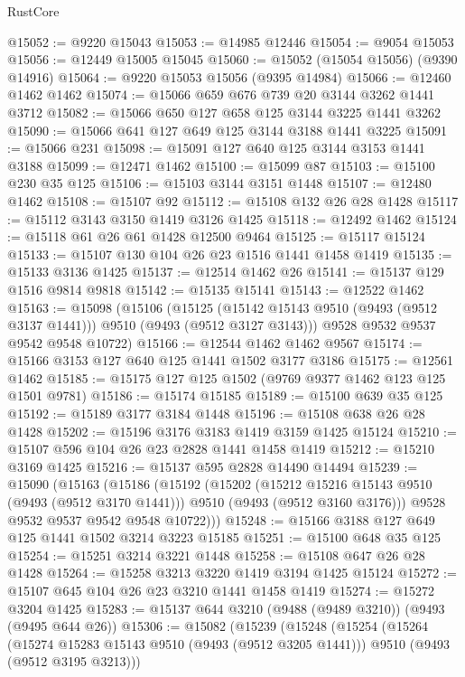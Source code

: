 \begin{lexlean}{RustCore}
\begin{coremodule}
@15052 := @9220 @15043
@15053 := @14985 @12446
@15054 := @9054 @15053
@15056 := @12449 @15005 @15045
@15060 := @15052 (@15054 @15056) (@9390 @14916)
@15064 := @9220 @15053 @15056 (@9395 @14984)
@15066 := @12460 @1462 @1462
@15074 := @15066 @659 @676 @739 @20 @3144 @3262 @1441 @3712
@15082 := @15066 @650 @127 @658 @125 @3144 @3225 @1441 @3262
@15090 := @15066 @641 @127 @649 @125 @3144 @3188 @1441 @3225
@15091 := @15066 @231
@15098 := @15091 @127 @640 @125 @3144 @3153 @1441 @3188
@15099 := @12471 @1462
@15100 := @15099 @87
@15103 := @15100 @230 @35 @125
@15106 := @15103 @3144 @3151 @1448
@15107 := @12480 @1462
@15108 := @15107 @92
@15112 := @15108 @132 @26 @28 @1428
@15117 := @15112 @3143 @3150 @1419 @3126 @1425
@15118 := @12492 @1462
@15124 := @15118 @61 @26 @61 @1428 @12500 @9464
@15125 := @15117 @15124
@15133 := @15107 @130 @104 @26 @23 @1516 @1441 @1458 @1419
@15135 := @15133 @3136 @1425
@15137 := @12514 @1462 @26
@15141 := @15137 @129 @1516 @9814 @9818
@15142 := @15135 @15141
@15143 := @12522 @1462
@15163 := @15098
    (@15106
      (@15125 (@15142 @15143 @9510 (@9493 (@9512 @3137 @1441))) @9510 (@9493 (@9512 @3127 @3143)))
      @9528
      @9532
      @9537
      @9542
      @9548
      @10722)
@15166 := @12544 @1462 @1462 @9567
@15174 := @15166 @3153 @127 @640 @125 @1441 @1502 @3177 @3186
@15175 := @12561 @1462
@15185 := @15175 @127 @125 @1502 (@9769 @9377 @1462 @123 @125 @1501 @9781)
@15186 := @15174 @15185
@15189 := @15100 @639 @35 @125
@15192 := @15189 @3177 @3184 @1448
@15196 := @15108 @638 @26 @28 @1428
@15202 := @15196 @3176 @3183 @1419 @3159 @1425 @15124
@15210 := @15107 @596 @104 @26 @23 @2828 @1441 @1458 @1419
@15212 := @15210 @3169 @1425
@15216 := @15137 @595 @2828 @14490 @14494
@15239 := @15090
    (@15163
      (@15186
        (@15192
          (@15202
            (@15212 @15216 @15143 @9510 (@9493 (@9512 @3170 @1441)))
            @9510
            (@9493 (@9512 @3160 @3176)))
          @9528
          @9532
          @9537
          @9542
          @9548
          @10722)))
@15248 := @15166 @3188 @127 @649 @125 @1441 @1502 @3214 @3223 @15185
@15251 := @15100 @648 @35 @125
@15254 := @15251 @3214 @3221 @1448
@15258 := @15108 @647 @26 @28 @1428
@15264 := @15258 @3213 @3220 @1419 @3194 @1425 @15124
@15272 := @15107 @645 @104 @26 @23 @3210 @1441 @1458 @1419
@15274 := @15272 @3204 @1425
@15283 := @15137 @644 @3210 (@9488 (@9489 @3210)) (@9493 (@9495 @644 @26))
@15306 := @15082
    (@15239
      (@15248
        (@15254
          (@15264
            (@15274 @15283 @15143 @9510 (@9493 (@9512 @3205 @1441)))
            @9510
            (@9493 (@9512 @3195 @3213)))

\end{coremodule}
\end{lexlean}
